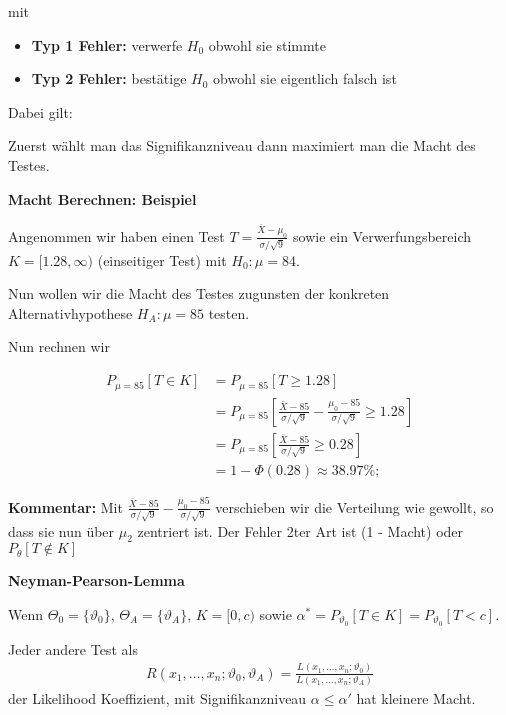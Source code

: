 \documentclass[25pt]{sciposter}
\newenvironment{thm}[1]{\begin{mdframed}[backgroundcolor=pink!20,innertopmargin=15pt, innerbottommargin=15pt, nobreak=true]
		\textbf{#1 }
	}
	{ 
	\end{mdframed}
}
\begin{document}
\begin{multicols}{3}
mit 

\begin{itemize}
	\item \textbf{Typ 1 Fehler:} verwerfe $H_0$ obwohl sie stimmte
	\item \textbf{Typ 2 Fehler:} bestätige $H_0$ obwohl sie eigentlich falsch ist
\end{itemize}

Dabei gilt:

Zuerst wählt man das Signifikanzniveau dann maximiert man die Macht des Testes.


\textbf{Macht Berechnen: Beispiel}

Angenommen wir haben einen Test $T = \frac{\overline{X} - \mu_0}{\sigma / \sqrt{9}}$ sowie ein Verwerfungsbereich $K=[1.28,\infty)$ (einseitiger Test) mit $H_0 : \mu = 84$.

Nun wollen wir die Macht des Testes zugunsten der konkreten Alternativhypothese $H_A: \mu = 85$ testen.

Nun rechnen wir

\begin{align*}
	P_{\mu = 85}[T\in K] &= P_{\mu = 85}[T\geq 1.28]\\
	&= P_{\mu = 85} \left[\frac{\overline{X} -85}{\sigma / \sqrt{9}} - \frac{\mu_0  -85}{\sigma / \sqrt{9}} \geq 1.28 \right]\\
	&= P_{\mu = 85} \left[\frac{\overline{X} -85}{\sigma / \sqrt{9}}  \geq 0.28 \right]\\
	&= 1 - \Phi(0.28) \approx 38.97\%;
\end{align*}

\textbf{Kommentar: } Mit $\frac{\overline{X} -85}{\sigma / \sqrt{9}} - \frac{\mu_0  -85}{\sigma / \sqrt{9}}$ verschieben wir die Verteilung wie gewollt, so dass sie nun über $\mu_2$ zentriert ist. Der Fehler 2ter Art ist (1 - Macht) oder $P_\theta [T\not \in K]$

\begin{thm}{Neyman-Pearson-Lemma}
	Wenn $\Theta_0 = \{\vartheta_0\}$, $\Theta_A = \{\vartheta_A\}$, $K = [0,c)$ sowie $\alpha^*= P_{\vartheta_0}[T\in K] = P_{\vartheta_0}[T < c]$.
	
	Jeder andere Test als 
	\begin{align*}
		R(x_1,\ldots,x_n;\vartheta_0, \vartheta_A) = \frac{L(x_1,\ldots,x_n;\vartheta_0)}{L(x_1,\ldots,x_n;\vartheta_A)}
	\end{align*}der Likelihood Koeffizient, mit Signifikanzniveau $\alpha \leq \alpha'$ hat kleinere Macht.
\end{thm}



\end{multicols}
\end{document}
